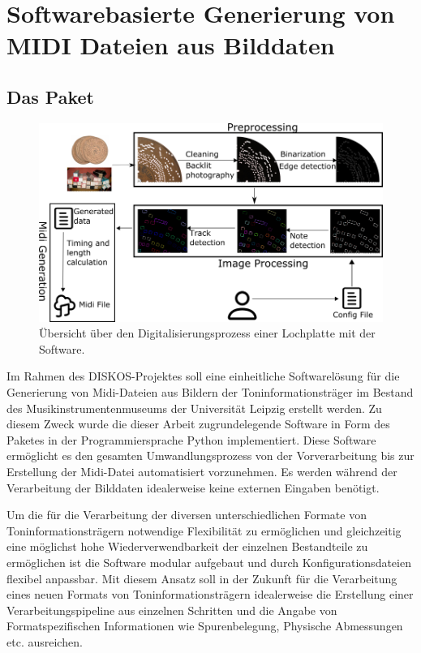 \FloatBarrier

\section{Softwarebasierte Generierung von MIDI Dateien aus Bilddaten}

\subsection{Das  Paket}

\begin{figure}[t]
    \centering
    \includegraphics[width=\textwidth]{graphics/flow_diagram.png}
    \caption{Übersicht über den Digitalisierungsprozess einer Lochplatte mit der  Software.}
    \label{softwareworkflow}
\end{figure}

Im Rahmen des DISKOS-Projektes soll eine einheitliche Softwarelösung für die Generierung von Midi-Dateien aus Bildern der Toninformationsträger im Bestand des Musikinstrumentenmuseums der Universität Leipzig erstellt werden.
Zu diesem Zweck wurde die dieser Arbeit zugrundelegende Software in Form des  Paketes in der Programmiersprache Python \parencite[]{van1995python} implementiert.
Diese Software ermöglicht es den gesamten Umwandlungsprozess von der Vorverarbeitung bis zur Erstellung der Midi-Datei automatisiert vorzunehmen.
Es werden während der Verarbeitung der Bilddaten idealerweise keine externen Eingaben benötigt.

Um die für die Verarbeitung der diversen unterschiedlichen Formate von Toninformationsträgern notwendige Flexibilität zu ermöglichen und gleichzeitig eine möglichst hohe Wiederverwendbarkeit der einzelnen Bestandteile zu ermöglichen ist die Software modular aufgebaut und durch Konfigurationsdateien flexibel anpassbar.
Mit diesem Ansatz soll in der Zukunft für die Verarbeitung eines neuen Formats von Toninformationsträgern idealerweise die Erstellung einer Verarbeitungspipeline aus einzelnen Schritten und die Angabe von Formatspezifischen Informationen wie Spurenbelegung, Physische Abmessungen etc. ausreichen.

